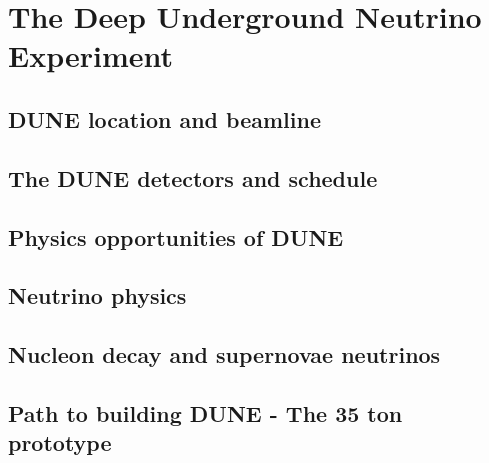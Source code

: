 
\chapter{The Deep Underground Neutrino Experiment}  %

\ifpdf
    \graphicspath{{DUNE/Figs/Raster/}{DUNE/Figs/PDF/}{DUNE/Figs/}}
\else
    \graphicspath{{DUNE/Figs/Vector/}{DUNE/Figs/}}
\fi

\section{DUNE location and beamline} %

\section{The DUNE detectors and schedule}  %

\section{Physics opportunities of DUNE} %

\section*{Neutrino physics}  %

\section{Nucleon decay and supernovae neutrinos}  %

\section{Path to building DUNE - The 35 ton prototype}  %


